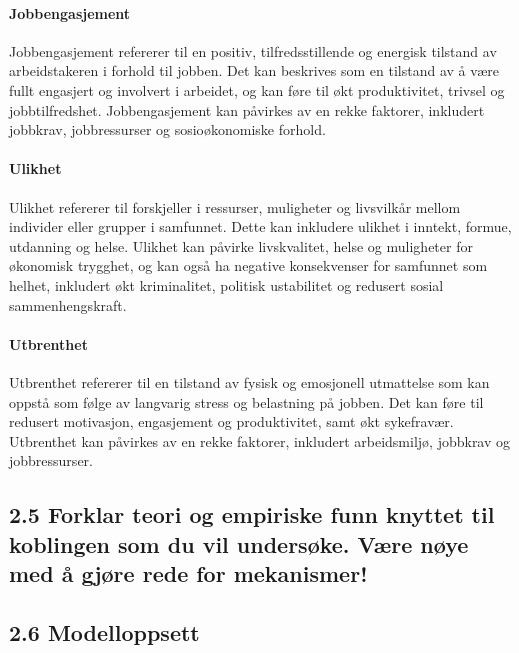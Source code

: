 \documentclass[
  12pt,
  a4paper,
  DIV=11,
  numbers=noendperiod]{scrartcl}
\let\oldparagraph\paragraph
\renewcommand{\paragraph}[1]{\oldparagraph{#1}\mbox{}}
\begin{document}
\paragraph{Jobbengasjement}\label{jobbengasjement}

Jobbengasjement refererer til en positiv, tilfredsstillende og energisk
tilstand av arbeidstakeren i forhold til jobben. Det kan beskrives som
en tilstand av å være fullt engasjert og involvert i arbeidet, og kan
føre til økt produktivitet, trivsel og jobbtilfredshet. Jobbengasjement
kan påvirkes av en rekke faktorer, inkludert jobbkrav, jobbressurser og
sosioøkonomiske forhold.

\paragraph{Ulikhet}\label{ulikhet}

Ulikhet refererer til forskjeller i ressurser, muligheter og livsvilkår
mellom individer eller grupper i samfunnet. Dette kan inkludere ulikhet
i inntekt, formue, utdanning og helse. Ulikhet kan påvirke livskvalitet,
helse og muligheter for økonomisk trygghet, og kan også ha negative
konsekvenser for samfunnet som helhet, inkludert økt kriminalitet,
politisk ustabilitet og redusert sosial sammenhengskraft.

\paragraph{Utbrenthet}\label{utbrenthet}

Utbrenthet refererer til en tilstand av fysisk og emosjonell utmattelse
som kan oppstå som følge av langvarig stress og belastning på jobben.
Det kan føre til redusert motivasjon, engasjement og produktivitet, samt
økt sykefravær. Utbrenthet kan påvirkes av en rekke faktorer, inkludert
arbeidsmiljø, jobbkrav og jobbressurser.

\subsection{2.5 Forklar teori og empiriske funn knyttet til koblingen
som du vil undersøke. Være nøye med å gjøre rede for
mekanismer!}\label{forklar-teori-og-empiriske-funn-knyttet-til-koblingen-som-du-vil-undersuxf8ke.-vuxe6re-nuxf8ye-med-uxe5-gjuxf8re-rede-for-mekanismer}

\subsection{2.6 Modelloppsett}\label{modelloppsett}
\end{document}

